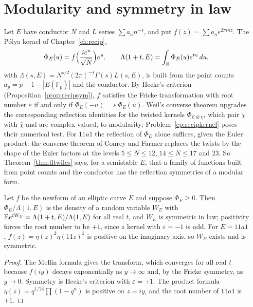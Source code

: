 \section{Modularity and symmetry in law}\label{sec:fltsymmetry}

Let $E$ have conductor $N$ and $L$ series $\sum a_nn^{-s}$, and put $f(z)=\sum a_ne^{2\pi inz}$. The P\'olya kernel of Chapter~\ref{ch:recip},
\[
\Phi_E(u)=f\Bigl(\frac{ie^u}{\sqrt N}\Bigr)e^{u},\qquad \Lambda(1+t,E)=\int_{\mathbb{R}}\Phi_E(u)e^{tu}\,du,
\]
with $\Lambda(s,E)=N^{s/2}(2\pi)^{-s}\Gamma(s)L(s,E)$, is built from the point counts $a_p=p+1-|E(\mathbb F_p)|$ and the conductor. By Hecke's criterion (Proposition~\ref{prop:recipsym}), $f$ satisfies the Fricke transformation with root number $\varepsilon$ if and only if $\Phi_E(-u)=\varepsilon\,\Phi_E(u)$. Weil's converse theorem \cite{weil1967} upgrades the corresponding reflection identities for the twisted kernels $\Phi_{E\otimes\chi}$, which pair $\chi$ with $\bar\chi$ and are complex valued, to modularity; Problem~\ref{cp:recipkernel} poses their numerical test. For $11a1$ the reflection of $\Phi_E$ alone suffices, given the Euler product: the converse theorem of Conrey and Farmer \cite{conreyfarmer1995} replaces the twists by the shape of the Euler factors at the levels $5\le N\le12$, $14\le N\le17$ and $23$. So Theorem~\ref{thm:fltwiles} says, for a semistable $E$, that a family of functions built from point counts and the conductor has the reflection symmetries of a modular form.

\begin{proposition}\label{prop:fltsymmetric}
Let $f$ be the newform of an elliptic curve $E$ and suppose $\Phi_E\ge0$. Then $\Phi_E/\Lambda(1,E)$ is the density of a random variable $W_E$ with $\mathbb{E} e^{tW_E}=\Lambda(1+t,E)/\Lambda(1,E)$ for all real $t$, and $W_E$ is symmetric in law; positivity forces the root number to be $+1$, since a kernel with $\varepsilon=-1$ is odd. For $E=11a1$, $f(z)=\eta(z)^2\eta(11z)^2$ is positive on the imaginary axis, so $W_E$ exists and is symmetric.
\end{proposition}

\begin{proof}
The Mellin formula gives the transform, which converges for all real $t$ because $f(iy)$ decays exponentially as $y\to\infty$ and, by the Fricke symmetry, as $y\to0$. Symmetry is Hecke's criterion with $\varepsilon=+1$. The product formula $\eta(z)=q^{1/24}\prod(1-q^n)$ is positive on $z=iy$, and the root number of $11a1$ is $+1$.
\end{proof}

